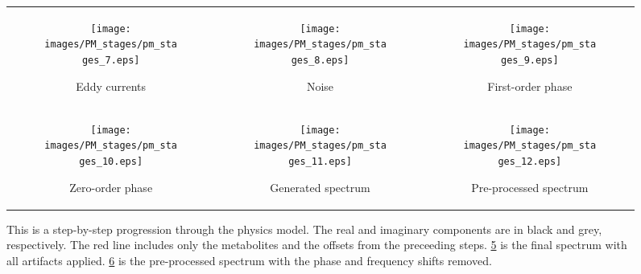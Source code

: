 \begin{figure}
\begin{tabular}[l]{ccc}
\begin{subfigure}[c]{0.315\textwidth}
        \texttt{[image: images/PM\_stages/pm\_stages\_7.eps]}
        \caption{Eddy currents}
        \label{fig:PM_stages:fshift}\vspace{0.2\baselineskip}
    \end{subfigure}&
    \begin{subfigure}[c]{0.315\textwidth}
        \texttt{[image: images/PM\_stages/pm\_stages\_8.eps]}
        \caption{Noise}
        \label{fig:PM_stages:SNR}\vspace{0.2\baselineskip}
    \end{subfigure}&
    \begin{subfigure}[c]{0.315\textwidth}
        \texttt{[image: images/PM\_stages/pm\_stages\_9.eps]}
        \caption{First-order phase}
        \label{fig:PM_stages:residual water}\vspace{0.2\baselineskip}
    \end{subfigure}\\[25pt]
    \begin{subfigure}[c]{0.315\textwidth}
        \texttt{[image: images/PM\_stages/pm\_stages\_10.eps]}
        \vspace{0.5pt}
        \caption{Zero-order phase}
        \label{fig:PM_stages:baseline}
    \end{subfigure}&
    \begin{subfigure}[c]{0.315\textwidth}
        \texttt{[image: images/PM\_stages/pm\_stages\_11.eps]}
        \vspace{0.5mm}
        \caption{Generated spectrum}
        \label{fig:PM_stages:generated spectrum}
    \end{subfigure}&
    \begin{subfigure}[c]{0.315\textwidth}
        \texttt{[image: images/PM\_stages/pm\_stages\_12.eps]} \smallskip
        \caption{Pre-processed spectrum}
        \label{fig:PM_stages:corrected}
    \end{subfigure}
    \end{tabular}
    \caption{This is a step-by-step progression through the physics model. The real and imaginary components are in black and grey, respectively. The red line includes only the metabolites and the offsets from the preceeding steps. \ref{fig:PM_stages:generated spectrum} is the final spectrum with all artifacts applied. \ref{fig:PM_stages:corrected} is the pre-processed spectrum with the phase and frequency shifts removed.}
    \label{fig:PM compilation}
\end{figure}
